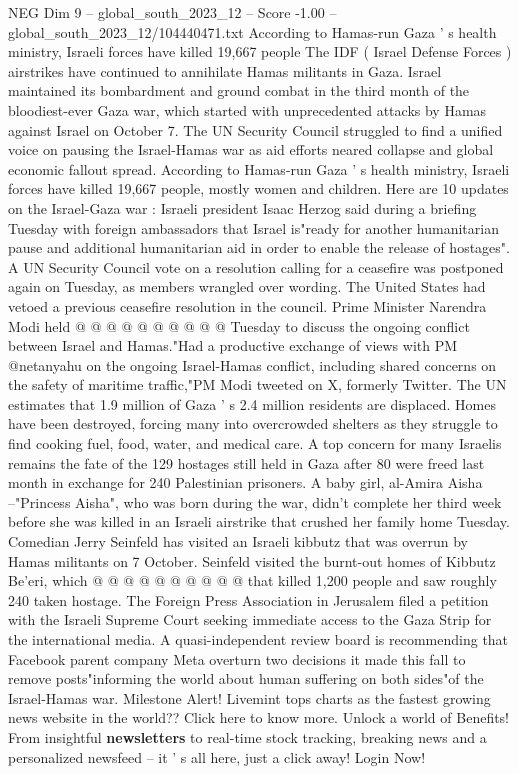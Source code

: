 \begin{textsample}{NEG Dim 9 – global\_south\_2023\_12 – Score -1.00 – global\_south\_2023\_12/104440471.txt}  \label{ex:f9_neg_444}
According to Hamas-run Gaza ' s health ministry, Israeli forces have killed 19,667 people The IDF ( Israel Defense Forces ) airstrikes have continued to annihilate Hamas militants in Gaza.
Israel maintained its bombardment and ground combat in the third month of the bloodiest-ever Gaza war, which started with unprecedented attacks by Hamas against Israel on October 7.
The UN Security Council struggled to find a unified voice on pausing the Israel-Hamas war as aid efforts neared collapse and global economic fallout spread.
According to Hamas-run Gaza ' s health ministry, Israeli forces have killed 19,667 people, mostly women and children.
Here are 10 updates on the Israel-Gaza war : Israeli president Isaac Herzog said during a briefing Tuesday with foreign ambassadors that Israel is"ready for another humanitarian pause and additional humanitarian aid in order to enable the release of hostages".
A UN Security Council vote on a resolution calling for a ceasefire was postponed again on Tuesday, as members wrangled over wording.
The United States had vetoed a previous ceasefire resolution in the council.
Prime Minister Narendra Modi held @ @ @ @ @ @ @ @ @ @ Tuesday to discuss the ongoing conflict between Israel and Hamas."Had a productive exchange of views with PM @netanyahu on the ongoing Israel-Hamas conflict, including shared concerns on the safety of maritime traffic,"PM Modi tweeted on X, formerly Twitter.
The UN estimates that 1.9 million of Gaza ' s 2.4 million residents are displaced.
Homes have been destroyed, forcing many into overcrowded shelters as they struggle to find cooking fuel, food, water, and medical care.
A top concern for many Israelis remains the fate of the 129 hostages still held in Gaza after 80 were freed last month in exchange for 240 Palestinian prisoners.
A baby girl, al-Amira Aisha --"Princess Aisha", who was born during the war, didn't complete her third week before she was killed in an Israeli airstrike that crushed her family home Tuesday.
Comedian Jerry Seinfeld has visited an Israeli kibbutz that was overrun by Hamas militants on 7 October.
Seinfeld visited the burnt-out homes of Kibbutz Be'eri, which @ @ @ @ @ @ @ @ @ @ that killed 1,200 people and saw roughly 240 taken hostage.
The Foreign Press Association in Jerusalem filed a petition with the Israeli Supreme Court seeking immediate access to the Gaza Strip for the international media.
A quasi-independent review board is recommending that Facebook parent company Meta overturn two decisions it made this fall to remove posts"informing the world about human suffering on both sides"of the Israel-Hamas war.
Milestone Alert!
Livemint tops charts as the fastest growing news website in the world??
Click here to know more.
Unlock a world of Benefits!
From insightful \textbf{newsletters} to real-time stock tracking, breaking news and a personalized newsfeed -- it ' s all here, just a click away!
Login Now!

\end{textsample}
